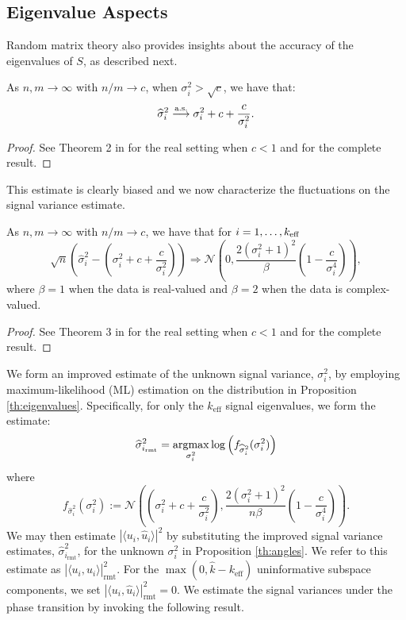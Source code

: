 \subsection{Eigenvalue Aspects}

Random matrix theory also provides insights about the accuracy of the eigenvalues of $S$, as described next.
\begin{prop}\label{th:high_eigvals}
As $n,m \longrightarrow \infty$ with $n/m \to c$, when $\sigma_i^2 > \sqrt{c}$, we have that:
\begin{equation*}
\widehat{\sigma}_i^2\overset{\textrm{a.s.}}{\longrightarrow} \sigma_i^2 + c + \frac{c}{\sigma_i^2}.
\end{equation*}
\end{prop}
\begin{proof}
See Theorem 2 in \cite{paul2007asymptotics} for the real setting when $c<1$ and \cite{benaych2011singular} for the complete result.
\end{proof}
This estimate is clearly biased and we now characterize the fluctuations on the signal variance estimate.
\begin{prop}\label{th:eigenvalues}
As $n,m \longrightarrow \infty$ with $n/m \to c$, we have that for $i = 1, \ldots, k_\text{eff}$
\begin{equation*}
\sqrt{n}\left(\widehat{\sigma}_i^2-\left(\sigma_i^2+c+\frac{c}{\sigma_i^2}\right)\right)\Rightarrow\mathcal{N}\left(0,\frac{2\left(\sigma_i^2+1\right)^2}{\beta }\left(1-\frac{c}{\sigma_i^4}\right)\right),
\end{equation*}
where $\beta = 1$ when the data is real-valued and $\beta = 2$ when the data is complex-valued.
\end{prop}
\begin{proof}
See Theorem 3 in \cite{paul2007asymptotics} for the real setting when $c<1$ and \cite{benaych2011singular} for the complete result.
\end{proof}
We form an improved estimate of the unknown signal variance, $\sigma_{i}^{2}$, by employing maximum-likelihood (ML) estimation on the distribution in Proposition \ref{th:eigenvalues}. Specifically, for only the $k_\text{eff}$ signal eigenvalues, we form the estimate:
\begin{equation}\label{eq:cov}
\widehat{\sigma}^2_{i_\text{rmt}} = \argmax_{\sigma_i^2} \log\left(f_{\widehat{\sigma}_i^2}(\sigma_i^2)\right)
\end{equation}
where
\begin{equation*}
f_{\widehat{\sigma}_i^2}(\sigma_i^2):=\mathcal{N}\left(\left(\sigma_i^2+c+\frac{c}{\sigma_i^2}\right),\frac{2\left(\sigma_i^2+1\right)^2}{n\beta }\left(1-\frac{c}{\sigma_i^4}\right)\right).
\end{equation*}
We may then estimate $|\langle u_i,\widehat{u}_i\rangle|^2$ by substituting the improved signal variance estimates, $\widehat{\sigma}^2_{i_\text{rmt}}$, for the unknown $\sigma_i^2$ in Proposition \ref{th:angles}. We refer to this estimate as $|\langle u_i,\widehat{u}_i\rangle|^2_{\text{rmt}}$. For the $\max(0,\widehat{k}-k_\text{eff})$ uninformative subspace components, we set $|\langle u_i,\widehat{u}_i\rangle|^2_{\text{rmt}}=0$. We estimate the signal variances under the phase transition by invoking the following result.\\

